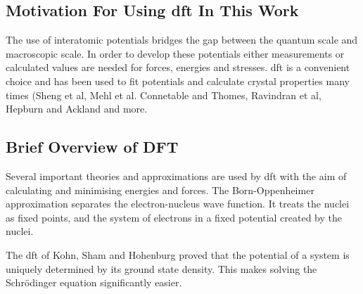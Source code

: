 \FloatBarrier
\subsection{Motivation For Using \acrshort{dft} In This Work}

The use of interatomic potentials bridges the gap between the quantum scale and macroscopic scale.  In order to develop these potentials either measurements or calculated values are needed for forces, energies and stresses.  \acrshort{dft} is a convenient choice and has been used to fit potentials and calculate crystal properties many times (Sheng et al\cite{shengeam}, Mehl et al.\cite{mehlsp} Connetable and Thomes,\cite{orthonisi} Ravindran et al\cite{dftrfkj}, Hepburn and Ackland\cite{hepburnfec} and more.


\FloatBarrier
\subsection{Brief Overview of DFT}

Several important theories and approximations are used by \acrshort{dft} with the aim of calculating and minimising energies and forces.  The Born-Oppenheimer approximation separates the electron-nucleus wave function.  It treats the nuclei as fixed points, and the system of electrons in a fixed potential created by the nuclei.


The \acrshort{dft} of Kohn, Sham and Hohenburg proved that the potential of a system is uniquely determined by its ground state density.  This makes solving the Schr\"{o}dinger equation significantly easier.

